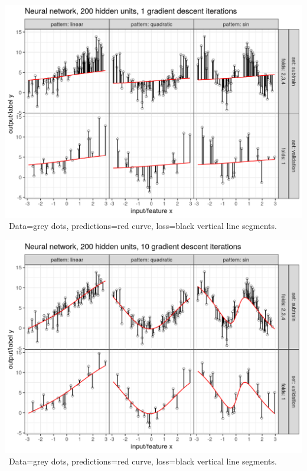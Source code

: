 
\begin{frame}
  \includegraphics[width=\textwidth]{figure-overfitting-pred-units=200-maxit=1.png}
\
Data=grey dots, predictions=red curve, loss=black vertical line segments.
\end{frame}


\begin{frame}
  \includegraphics[width=\textwidth]{figure-overfitting-pred-units=200-maxit=10.png}
\
Data=grey dots, predictions=red curve, loss=black vertical line segments.
\end{frame}


